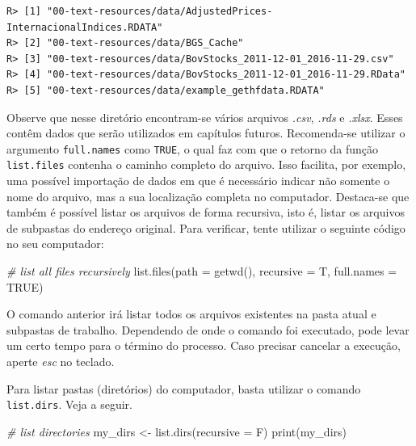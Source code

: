 \documentclass[
  11pt,
]{book}
\newenvironment{Shaded}{\begin{snugshade}}{\end{snugshade}}
\newcommand{\AttributeTok}[1]{\textcolor[rgb]{0.61,0.61,0.61}{#1}}
\newcommand{\CommentTok}[1]{\textcolor[rgb]{0.37,0.37,0.37}{\textit{#1}}}
\newcommand{\ConstantTok}[1]{\textcolor[rgb]{0,0,0}{#1}}
\newcommand{\FunctionTok}[1]{\textcolor[rgb]{0,0,0}{#1}}
\newcommand{\NormalTok}[1]{#1}
\newcommand{\OtherTok}[1]{\textcolor[rgb]{0.37,0.37,0.37}{#1}}
\begin{document}
\begin{verbatim}
R> [1] "00-text-resources/data/AdjustedPrices-InternacionalIndices.RDATA"
R> [2] "00-text-resources/data/BGS_Cache"                                
R> [3] "00-text-resources/data/BovStocks_2011-12-01_2016-11-29.csv"      
R> [4] "00-text-resources/data/BovStocks_2011-12-01_2016-11-29.RData"    
R> [5] "00-text-resources/data/example_gethfdata.RDATA"
\end{verbatim}

Observe que nesse diretório encontram-se vários arquivos \emph{.csv}, \emph{.rds} e \emph{.xlsx}. Esses contêm dados que serão utilizados em capítulos futuros. Recomenda-se utilizar o argumento \texttt{full.names} como \texttt{TRUE}, o qual faz com que o retorno da função \texttt{list.files} contenha o caminho completo do arquivo. Isso facilita, por exemplo, uma possível importação de dados em que é necessário indicar não somente o nome do arquivo, mas a sua localização completa no computador. Destaca-se que também é possível listar os arquivos de forma recursiva, isto é, listar os arquivos de subpastas do endereço original. Para verificar, tente utilizar o seguinte código no seu computador:

\begin{Shaded}
\begin{Highlighting}[]
\CommentTok{\# list all files recursively}
\FunctionTok{list.files}\NormalTok{(}\AttributeTok{path =} \FunctionTok{getwd}\NormalTok{(), }\AttributeTok{recursive =}\NormalTok{ T, }\AttributeTok{full.names =} \ConstantTok{TRUE}\NormalTok{)}
\end{Highlighting}
\end{Shaded}

O comando anterior irá listar todos os arquivos existentes na pasta atual e subpastas de trabalho. Dependendo de onde o comando foi executado, pode levar um certo tempo para o término do processo. Caso precisar cancelar a execução, aperte \emph{esc} no teclado.

Para listar pastas (diretórios) do computador, basta utilizar o comando \texttt{list.dirs}. Veja a seguir.

\begin{Shaded}
\begin{Highlighting}[]
\CommentTok{\# list directories}
\NormalTok{my\_dirs }\OtherTok{\textless{}{-}} \FunctionTok{list.dirs}\NormalTok{(}\AttributeTok{recursive =}\NormalTok{ F)}
\FunctionTok{print}\NormalTok{(my\_dirs)}
\end{Highlighting}
\end{Shaded}
\end{document}
